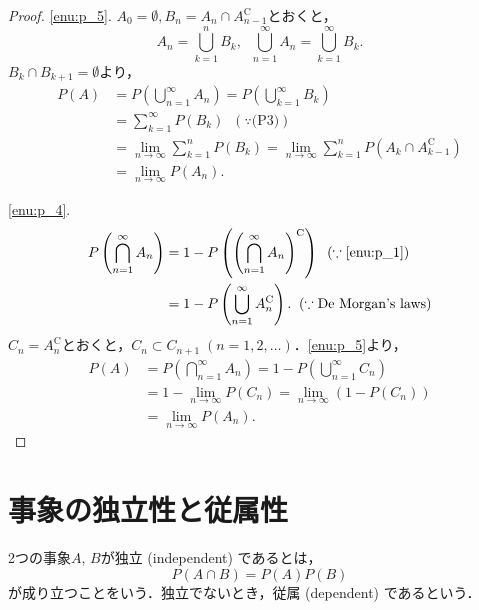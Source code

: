 \documentclass{jsreport}
\begin{document}
\begin{proof}
  \ref{enu:p_5}.
  $A_0 = \emptyset, B_n = A_n \cap A_{n - 1}^{\mathrm{C}}$とおくと，
  \begin{equation}
    A_n = \bigcup_{k = 1}^n B_k, \; \; \bigcup_{n = 1}^{\infty} A_n = \bigcup_{k = 1}^{\infty} B_k. \nonumber
  \end{equation}
  $B_k \cap B_{k + 1} = \emptyset$より，
  \begin{align}
    P(A) &= P\left(\bigcup_{n = 1}^{\infty} A_n \right) = P\left(\bigcup_{k = 1}^{\infty} B_k\right) \nonumber \\
    &= \sum_{k = 1}^{\infty} P(B_k) \; \; (\because \mbox{(P3)}) \nonumber \\
    &= \lim_{n \to \infty} \sum_{k = 1}^n P(B_k) = \lim_{n \to \infty} \sum_{k = 1}^n P(A_k \cap A_{k - 1}^{\mathrm{C}}) \nonumber \\
    &= \lim_{n \to \infty} P(A_n). \nonumber
  \end{align}

  \ref{enu:p_4}.
  \begin{align}
    P\left(\bigcap_{n = 1}^{\infty} A_n \right) &= 1 - P\left(\left(\bigcap_{n = 1}^{\infty} A_n\right)^{\mathrm{C}}\right) \; \; (\because \mbox{\ref{enu:p_1}}) \nonumber \\
    &= 1 - P\left(\bigcup_{n = 1}^{\infty} A_n^{\mathrm{C}}\right). \; \; (\because \mbox{De Morgan's laws}) \nonumber
  \end{align}
  $C_n = A_n^{\mathrm{C}}$とおくと，$C_n \subset C_{n + 1} \; (n = 1, 2, \ldots)$．\ref{enu:p_5}より，
  \begin{align}
    P(A) &= P\left(\bigcap_{n = 1}^{\infty} A_n \right) = 1 - P\left(\bigcup_{n = 1}^{\infty} C_n \right) \nonumber \\
    &= 1 - \lim_{n \to \infty} P(C_n) = \lim_{n \to \infty} (1 - P(C_n)) \nonumber \\
    &= \lim_{n \to \infty} P(A_n). \nonumber
  \end{align}
\end{proof}

\section{事象の独立性と従属性}
\begin{screen}
  \begin{defi}[独立性]
    2つの事象$A, \, B$が独立 (independent) であるとは，
    \begin{equation}
      P(A \cap B) = P(A) P(B) \nonumber
    \end{equation}
    が成り立つことをいう．独立でないとき，従属 (dependent) であるという．
  \end{defi}
\end{screen}
\end{document}

